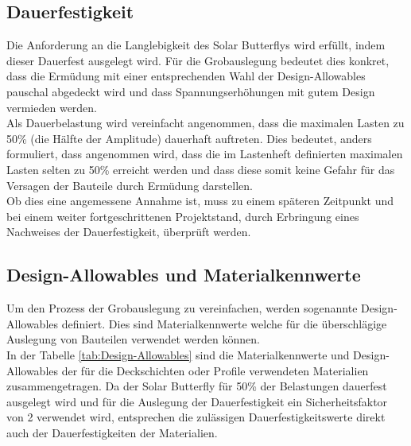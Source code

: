 \subsection{Dauerfestigkeit}
Die Anforderung an die Langlebigkeit des Solar Butterflys wird erfüllt, indem dieser Dauerfest ausgelegt wird. Für die Grobauslegung bedeutet dies konkret, dass die Ermüdung mit einer entsprechenden Wahl der Design-Allowables pauschal abgedeckt wird und dass Spannungserhöhungen mit gutem Design vermieden werden.\\
Als Dauerbelastung wird vereinfacht angenommen, dass die maximalen Lasten zu 50\% (die Hälfte der Amplitude) dauerhaft auftreten. Dies bedeutet, anders formuliert, dass angenommen wird, dass die im Lastenheft definierten maximalen Lasten selten zu 50\% erreicht werden und dass diese somit keine Gefahr für das Versagen der Bauteile durch Ermüdung darstellen.\\
Ob dies eine angemessene Annahme ist, muss zu einem späteren Zeitpunkt und bei einem weiter fortgeschrittenen Projektstand, durch Erbringung eines Nachweises der Dauerfestigkeit, überprüft werden.
\newpage

\subsection{Design-Allowables und Materialkennwerte}
Um den Prozess der Grobauslegung zu vereinfachen, werden sogenannte Design-Allowables definiert. Dies sind Materialkennwerte welche für die überschlägige Auslegung von Bauteilen verwendet werden können.\\
In der Tabelle \ref{tab:Design-Allowables} sind die Materialkennwerte und Design-Allowables der für die Deckschichten oder Profile verwendeten Materialien zusammengetragen. Da der Solar Butterfly für 50\% der Belastungen dauerfest ausgelegt wird und für die Auslegung der Dauerfestigkeit ein Sicherheitsfaktor von 2 verwendet wird, entsprechen die zulässigen Dauerfestigkeitswerte direkt auch der Dauerfestigkeiten der Materialien.


